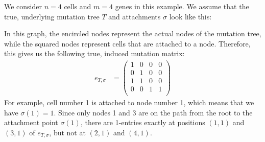 \begin{example}
    \label{exmpl:scite_problem}
    We consider $n = 4$ cells and $m = 4$ genes in this example. We assume that the true, underlying mutation tree $T$ and attachments $\sigma$ look like this:
    \begin{center}
    \end{center}
    In this graph, the encircled nodes represent the actual nodes of the mutation tree, while the squared nodes represent cells that are attached to a node. Therefore, this gives us the following true, induced mutation matrix:
    \begin{align*}
        e_{T, \sigma} &= \begin{pmatrix}
            1 & 0 & 0 & 0 \\
            0 & 1 & 0 & 0 \\
            1 & 1 & 0 & 0 \\
            0 & 0 & 1 & 1 \\
        \end{pmatrix}
    \end{align*}
    For example, cell number 1 is attached to node number 1, which means that we have $\sigma(1) = 1$. Since only nodes 1 and 3 are on the path from the root to the attachment point $\sigma(1)$, there are 1-entries exactly at positions $(1,1)$ and $(3,1)$ of $e_{T, \sigma}$, but not at $(2,1)$ and $(4,1)$.
    

\end{example}
